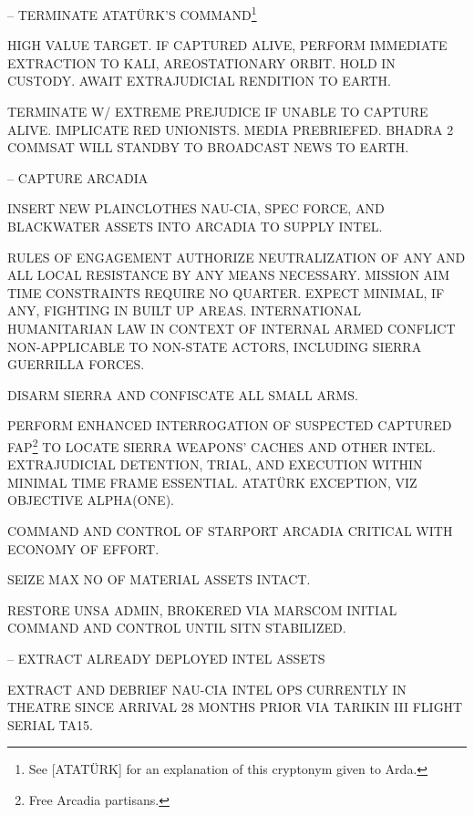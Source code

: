 \stopitemize

\startitemize[4]

\item {} -- TERMINATE ATATÜRK'S COMMAND\footnote{See [ATATÜRK] for an explanation of this cryptonym given to Arda.}

    \startitemize[n]
    \item HIGH VALUE TARGET. IF CAPTURED ALIVE, PERFORM IMMEDIATE EXTRACTION TO KALI, AREOSTATIONARY ORBIT. HOLD IN CUSTODY. AWAIT EXTRAJUDICIAL RENDITION TO EARTH.
    \item TERMINATE W/ EXTREME PREJUDICE IF UNABLE TO CAPTURE ALIVE. IMPLICATE RED UNIONISTS. MEDIA PREBRIEFED. BHADRA 2 COMMSAT WILL STANDBY TO BROADCAST NEWS TO EARTH.
    \stopitemize

\item {} -- CAPTURE ARCADIA
    \startitemize[n]
    \item INSERT NEW PLAINCLOTHES NAU-CIA, SPEC FORCE, AND BLACKWATER ASSETS INTO ARCADIA TO SUPPLY INTEL.

\page

    \item RULES OF ENGAGEMENT AUTHORIZE NEUTRALIZATION OF ANY AND ALL LOCAL RESISTANCE BY ANY MEANS NECESSARY. MISSION AIM TIME CONSTRAINTS REQUIRE NO QUARTER. EXPECT MINIMAL, IF ANY, FIGHTING IN BUILT UP AREAS. INTERNATIONAL HUMANITARIAN LAW IN CONTEXT OF INTERNAL ARMED CONFLICT NON-APPLICABLE TO NON-STATE ACTORS, INCLUDING SIERRA GUERRILLA FORCES.
    \item DISARM SIERRA AND CONFISCATE ALL SMALL ARMS.
    \item PERFORM ENHANCED INTERROGATION OF SUSPECTED CAPTURED FAP\footnote{Free Arcadia partisans.} TO LOCATE SIERRA WEAPONS' CACHES AND OTHER INTEL. EXTRAJUDICIAL DETENTION, TRIAL, AND EXECUTION WITHIN MINIMAL TIME FRAME ESSENTIAL. ATATÜRK EXCEPTION, VIZ OBJECTIVE ALPHA(ONE).
    \item COMMAND AND CONTROL OF STARPORT ARCADIA CRITICAL WITH ECONOMY OF EFFORT.
    \item SEIZE MAX NO OF MATERIAL ASSETS INTACT.
    \item RESTORE UNSA ADMIN, BROKERED VIA MARSCOM INITIAL COMMAND AND CONTROL UNTIL SITN STABILIZED.
    \stopitemize

\item {} -- EXTRACT ALREADY DEPLOYED INTEL ASSETS
    \startitemize[n]
    \item EXTRACT AND DEBRIEF NAU-CIA INTEL OPS CURRENTLY IN THEATRE SINCE ARRIVAL 28 MONTHS PRIOR VIA TARIKIN III FLIGHT SERIAL TA15.
    \stopitemize

